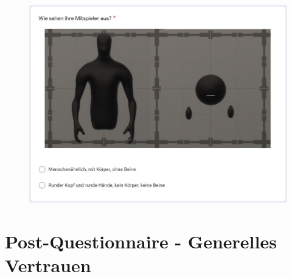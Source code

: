 \documentclass[a4paper,11pt]{article}%
\renewcommand{\\}{\vspace*{0.5\baselineskip} \newline}
\begin{document}
	\begin{figure}[H]
	\centering
		\begin{footnotesize}
			\includegraphics[scale=0.6]{Abbildungen/Fragebogen/Post-Questionnaire/PQM1}
		\end{footnotesize}
	\end{figure}	

\newpage

\section{Post-Questionnaire - Generelles Vertrauen}
\label{Post-Questionnaire - Generelles Vertrauen}
\end{document}
